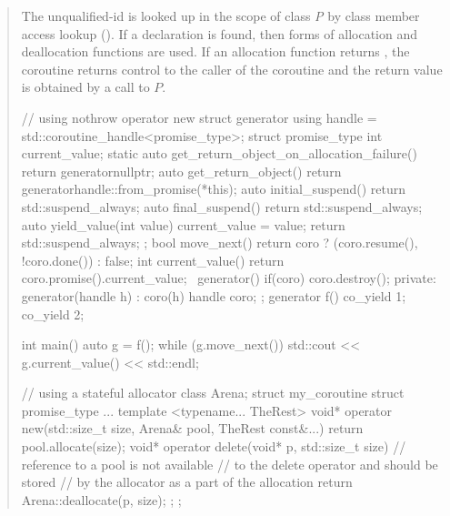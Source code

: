 \begin{quote}



\pnum
The unqualified-id  is looked up in the scope of class \textit{P}
by class member access lookup (). If a declaration is found,
 then  forms of allocation and deallocation functions are used. If an allocation function returns , the coroutine returns control to the caller of the coroutine and the return value is obtained by a call to $P$.

\enterexample
\begin{codeblock}
// using nothrow operator new
struct generator {
  using handle = std::coroutine_handle<promise_type>;
  struct promise_type {
    int current_value;
    static auto get_return_object_on_allocation_failure() { return generator{nullptr}; }
    auto get_return_object() { return generator{handle::from_promise(*this)}; }
    auto initial_suspend() { return std::suspend_always{}; }
    auto final_suspend() { return std::suspend_always{}; }
    auto yield_value(int value) { 
      current_value = value; 
      return std::suspend_always{};
    }
  };
  bool move_next() { return coro ? (coro.resume(), !coro.done()) : false; }
  int current_value() { return coro.promise().current_value; }
  ~generator() { if(coro) coro.destroy(); }
private:
  generator(handle h) : coro(h) {}
  handle coro;
};
generator f() { co_yield 1;  co_yield 2; }
 
int main() {
  auto g = f();
  while (g.move_next()) std::cout << g.current_value() << std::endl;
}

\end{codeblock}
\exitexample

\pnum
\enterexample
\begin{codeblock}
  // using a stateful allocator
  class Arena;
  struct my_coroutine {
    struct promise_type {
      ...
      template <typename... TheRest>
      void* operator new(std::size_t size, Arena& pool, TheRest const&...) {
        return pool.allocate(size);
      }
      void* operator delete(void* p, std::size_t size) {
      	// reference to a pool is not available
      	// to the delete operator and should be stored
      	// by the allocator as a part of the allocation
        return Arena::deallocate(p, size);
      }
    };
  };
  

\end{codeblock}
\end{quote}
